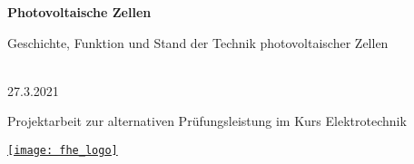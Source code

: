 \begin{titlepage}
    \begin{center}
        \Huge
        \textbf{Photovoltaische Zellen}

        \vspace{0.5cm}

        \LARGE
        Geschichte, Funktion und Stand der Technik photovoltaischer Zellen

        \vspace{1.5cm}

        \href{mailto:erik.buennig@fh-erfurt.de}{
        }\\
        27.3.2021

        \vfill

        \Large
        Projektarbeit zur alternativen Prüfungsleistung im Kurs Elektrotechnik

        \vspace{1.5cm}

        \href{https://www.fh-erfurt.de/fhe/}{
            \texttt{[image: fhe\_logo]}
        }
    \end{center}
\end{titlepage}